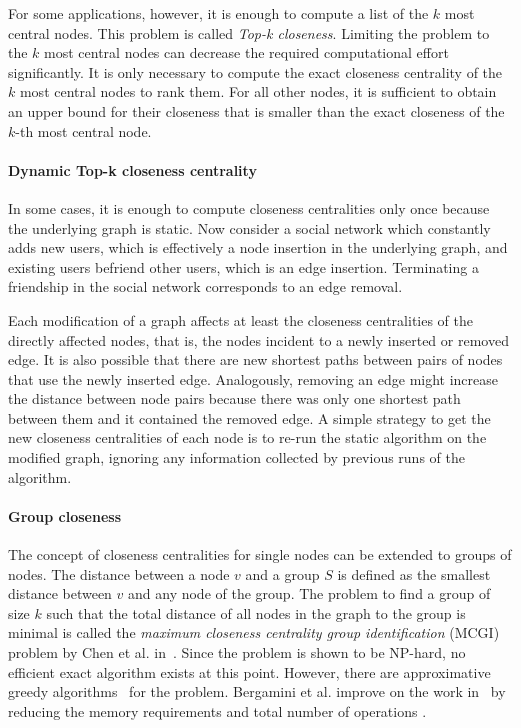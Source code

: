 For some applications, however, it is enough to compute a list of the $k$ most central nodes. This problem is called \emph{Top-k closeness}. Limiting the problem to the $k$ most central nodes can decrease the required computational effort significantly. It is only necessary to compute the exact closeness centrality of the $k$ most central nodes to rank them. For all other nodes, it is sufficient to obtain an upper bound for their closeness that is smaller than the exact closeness of the $k$-th most central node.


\paragraph{Dynamic Top-k closeness centrality}

In some cases, it is enough to compute closeness centralities only once because the underlying graph is static. Now consider a social network which constantly adds new users, which is effectively a node insertion in the underlying graph, and existing users befriend other users, which is an edge insertion. Terminating a friendship in the social network corresponds to an edge removal.

Each modification of a graph affects at least the closeness centralities of the directly affected nodes, that is, the nodes incident to a newly inserted or removed edge. It is also possible that there are new shortest paths between pairs of nodes that use the newly inserted edge. Analogously, removing an edge might increase the distance between node pairs because there was only one shortest path between them and it contained the removed edge. A simple strategy to get the new closeness centralities of each node is to re-run the static algorithm on the modified graph, ignoring any information collected by previous runs of the algorithm.

\paragraph{Group closeness}
The concept of closeness centralities for single nodes can be extended to groups of nodes. The distance between a node $v$ and a group $S$ is defined as the smallest distance between $v$ and any node of the group. The problem to find a group of size $k$ such that the total distance of all nodes in the graph to the group is minimal is called the \emph{maximum closeness centrality group identification} (MCGI) problem by Chen et al. in~\cite{Chen2016}. Since the problem is shown to be NP-hard, no efficient exact algorithm exists at this point. However, there are approximative greedy algorithms~\cite{Chen2016,zhao2014measuring} for the problem. Bergamini et al. improve on the work in~\cite{Chen2016} by reducing the memory requirements and total number of operations .

